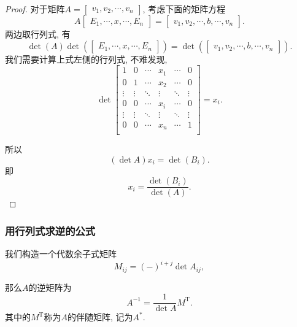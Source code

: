 \begin{proof}
    对于矩阵$A = \begin{bmatrix} v_1, v_2, \cdots, v_n \end{bmatrix}$, 考虑下面的矩阵方程
    \begin{equation}
      A \begin{bmatrix} E_1,  \cdots, x, \cdots,  E_n \end{bmatrix} = \begin{bmatrix} v_1, v_2, \cdots, b, \cdots, v_n \end{bmatrix}.
    \end{equation}
    两边取行列式, 有
    \begin{equation}
      \det \left( A \right) \det \left( \begin{bmatrix} E_1,  \cdots, x, \cdots,  E_n \end{bmatrix} \right) = \det \left( \begin{bmatrix} v_1, v_2, \cdots, b, \cdots, v_n \end{bmatrix} \right).
    \end{equation}
    我们需要计算上式左侧的行列式, 不难发现,
    \begin{equation}
      \det
      \begin{bmatrix}
         1 & 0 & \cdots & x_1 & \cdots & 0\\
            0 & 1 & \cdots & x_2 & \cdots & 0\\
            \vdots & \vdots & \ddots & \vdots & \ddots & \vdots\\
            0 & 0 & \cdots & x_i & \cdots & 0\\
            \vdots & \vdots & \ddots & \vdots & \ddots & \vdots\\
            0 & 0 & \cdots & x_n & \cdots & 1\\
      \end{bmatrix} = x_i.
    \end{equation}
    
    所以
    \begin{equation}
        \left( \det A \right) x_i = \det \left( B_i \right).
    \end{equation}
    即
    \begin{equation}
      x_i = \frac{\det \left( B_i \right)}{\det \left( A \right)}.
    \end{equation}
\end{proof}

\subsubsection{用行列式求逆的公式}
\begin{theorem}
    我们构造一个代数余子式矩阵
    \begin{equation}
        M_{ij} = \left( - \right) ^{i + j} \det A_{ij},
    \end{equation}
    
    那么$A$的逆矩阵为
    \begin{equation}
        A^{-1} = \frac{1}{\det A} M^{\mathrm{T}}.
    \end{equation}
    其中的$M^{\mathrm{T}}$称为$A$的伴随矩阵, 记为$A^{*}$.
\end{theorem}


